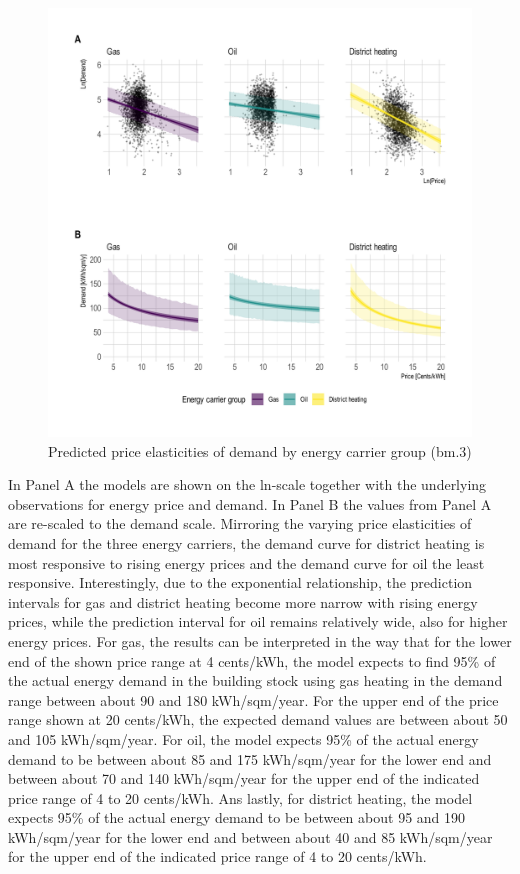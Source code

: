 \documentclass[12pt,twoside]{reedthesis}
\begin{document}
\begin{figure}

{\centering \includegraphics[width=1.04\linewidth]{figure/elasticity_predictions_subsample} 

}

\caption{Predicted price elasticities of demand by energy carrier group (bm.3)}\label{fig:elasticity-predictions-energy-carrier}
\end{figure}
In Panel A the models are shown on the ln-scale together with the underlying observations for energy price and demand. In Panel B the values from Panel A are re-scaled to the demand scale. Mirroring the varying price elasticities of demand for the three energy carriers, the demand curve for district heating is most responsive to rising energy prices and the demand curve for oil the least responsive. Interestingly, due to the exponential relationship, the prediction intervals for gas and district heating become more narrow with rising energy prices, while the prediction interval for oil remains relatively wide, also for higher energy prices. For gas, the results can be interpreted in the way that for the lower end of the shown price range at 4 cents/kWh, the model expects to find 95\% of the actual energy demand in the building stock using gas heating in the demand range between about 90 and 180 kWh/sqm/year. For the upper end of the price range shown at 20 cents/kWh, the expected demand values are between about 50 and 105 kWh/sqm/year. For oil, the model expects 95\% of the actual energy demand to be between about 85 and 175 kWh/sqm/year for the lower end and between about 70 and 140 kWh/sqm/year for the upper end of the indicated price range of 4 to 20 cents/kWh. Ans lastly, for district heating, the model expects 95\% of the actual energy demand to be between about 95 and 190 kWh/sqm/year for the lower end and between about 40 and 85 kWh/sqm/year for the upper end of the indicated price range of 4 to 20 cents/kWh.
\end{document}

